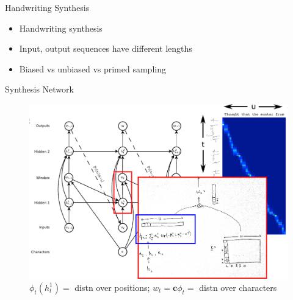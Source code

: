 \documentclass[10pt,xcolor=dvipsnames]{beamer}
\begin{document}
\begin{frame}{Handwriting Synthesis}
 \begin{itemize}
 \item 
 Handwriting synthesis 
 \item Input, output sequences have different lengths
 \item Biased vs unbiased vs primed sampling
 \end{itemize}
\end{frame}

\begin{frame}{Synthesis Network}
  \begin{figure}
    \centering
  \includegraphics[width=.9\linewidth]{fig/synthesis_network3.png}
    \caption{$\phi_t(h_t^1) = $ distn over positions; $w_t = \mathbf{c}
      \phi_t =$ distn over characters}
    \label{fig:synthesis-network}
  \end{figure}
\end{frame}
\end{document}
